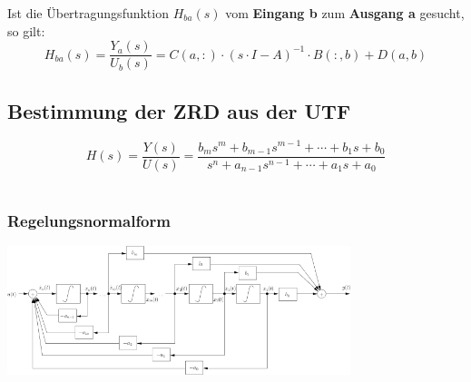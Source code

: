   Ist die Übertragungsfunktion $H_{ba}(s)$ vom \textbf{Eingang b} zum \textbf{Ausgang a} gesucht, so gilt:
  \[
    H_{ba}(s) = \frac{Y_a(s)}{U_b(s)} = C(a,:) \cdot (s \cdot I -A)^{-1} \cdot B(:,b) + D(a,b)
  \]


\subsection{Bestimmung der ZRD aus der UTF}
  \[ \boxed{
  H(s)=\frac{Y(s)}{U(s)}=\frac{b_{m} s^{m} + b_{m-1} s^{m-1} +\cdots+b_{1} s 
  + b_{0}}{s^{n} + a_{n-1} s^{n-1} + \cdots + a_{1} s + a_{0}}}
  \]\\


\subsubsection{Regelungsnormalform }
  \includegraphics[width=10cm]{./images/zrd-regelungsnormalform.png} \\
  \scriptsize
